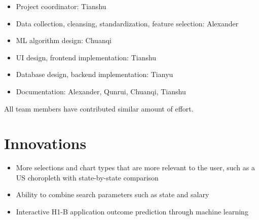 \documentclass[sigconf]{acmart}
\begin{document}
\begin{itemize}
	\item Project coordinator: Tianshu
	\item Data collection, cleansing, standardization, feature selection: Alexander
	\item ML algorithm design: Chuanqi 
	\item UI design, frontend implementation: Tianshu
	\item Database design, backend implementation: Tianyu
	\item Documentation: Alexander, Qunrui, Chuanqi, Tianshu
	
\end{itemize}

All team members have contributed similar amount of effort.

\section{Innovations}
\begin{itemize}
	\item More selections and chart types that are more relevant to the user, such as a US choropleth with state-by-state comparison
	\item Ability to combine search parameters such as state and salary
	\item Interactive H1-B application outcome prediction through machine learning

\end{itemize}
\end{document}
